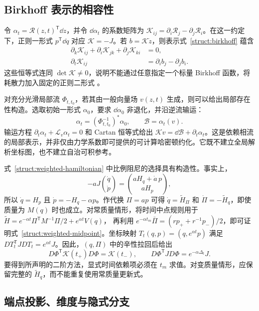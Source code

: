 \subsection{Birkhoff 表示的相容性}
\label{ss:birkhoff}

令 $\alpha_t=\mathcal R(z,t)^{\mathsf T}\dd z$，并令 $\dd\alpha_t$ 的系数矩阵为 $\mathcal K_{ij}=\partial_i\mathcal R_j-\partial_j\mathcal R_i$。在这一约定下，正则一形式 $p^{\mathsf T}\dd q$ 对应 $\mathcal K=-J$。若 $b=\mathcal K\dot z$，则表示式~\eqref{struct:birkhoff} 蕴含
\begin{equation}\label{ss:birkhoff-compatibility}
\begin{aligned}
 \partial_k\mathcal K_{ij}+\partial_i\mathcal K_{jk}
                       +\partial_j\mathcal K_{ki}&=0,\\
 \partial_t\mathcal K_{ij}&=\partial_i b_j-\partial_j b_i.
\end{aligned}
\end{equation}
这些恒等式连同 $\det\mathcal K\ne0$，说明不能通过任意指定一个标量 Birkhoff 函数，将耗散力加入固定的正则二形式 \citep{su2007,fengqin}。

对充分光滑局部流 $\Phi_{t,t_0}$，若其由一般向量场 $v(z,t)$ 生成，则可以给出局部存在性构造。选取初始一形式 $\alpha_0$，要求 $\dd\alpha_0$ 非退化，并沿逆流输运：
\[
 \alpha_t=(\Phi_{t,t_0}^{-1})^*\alpha_0,
 \qquad\mathcal B=\alpha_t(v).
\]
输运方程 $\partial_t\alpha_t+\mathcal L_v\alpha_t=0$ 和 Cartan 恒等式给出 $\mathcal K v=\dd\mathcal B+\partial_t\alpha_t$。这是依赖相流的局部表示，并非仅由力学系数即可提供的可计算哈密顿约化。它既不建立全局解析坐标图，也不建立自治可积参考。

式~\eqref{struct:weighted-hamiltonian} 中比例阻尼的选择具有构造性。事实上，
\[
 -aJ\binom{\dot q}{\dot p}
 =\binom{aH_q+\dot a\,p}{aH_p},
\]
所以 $\dot q=H_p$ 且 $\dot p=-H_q-\alpha p$。作代换 $\Pi=ap$ 可得
$\dot q=\widetilde H_\Pi$ 和 $\dot\Pi=-\widetilde H_q$，即使质量为 $M(q)$ 时也成立。对常质量情形，将时间中点规则用于
$\widetilde H=e^{-\alpha t}\Pi^{\mathsf T}M^{-1}\Pi/2+e^{\alpha t}V(q)$，
再利用 $e^{-\alpha t_m}\bar\Pi=(r p_++r^{-1}p_-)/2$，即可证明式~\eqref{struct:weighted-midpoint}。坐标映射 $T_t(q,p)=(q,e^{\alpha t}p)$ 满足 $DT_t^{\mathsf T}JDT_t=e^{\alpha t}J$。因此，$(q,\Pi)$ 中的辛性拉回后给出
\[
 D\Phi^{\mathsf T}\mathcal K(t_+)D\Phi=\mathcal K(t_-),
 \qquad D\Phi^{\mathsf T}JD\Phi=e^{-\alpha\Delta_t}J.
\]
要得到所声明的二阶方法，显式时间依赖项必须在 $t_m$ 求值。对变质量情形，应保留完整的 $\widetilde H_q$，而不能重复使用常质量更新式。

\subsection{端点投影、维度与隐式分支}
\label{ss:projection}

